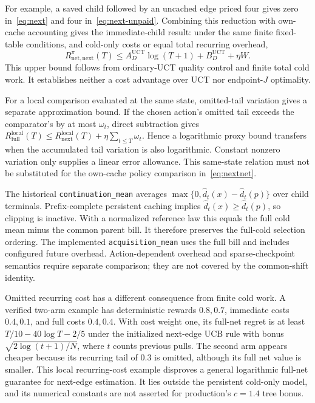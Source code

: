 For
example, a saved child followed by an uncached edge priced four gives zero
in~\eqref{eq:next} and four in~\eqref{eq:next-unpaid}.
Combining this reduction with own-cache accounting gives the immediate-child result: under the same finite fixed-table conditions, and cold-only costs or equal total recurring overhead,
\begin{equation}
 R_{\mathrm{net,next}}^\pi(T)
 \le A_D^{\mathrm{UCT}}\log(T+1)+B_D^{\mathrm{UCT}}+\eta W.
 \label{eq:nextnet}
\end{equation}
This upper bound follows from ordinary-UCT quality control and finite total cold work. It establishes neither a cost advantage over UCT nor endpoint-$J$ optimality.

For a local comparison evaluated at the same state, omitted-tail variation gives a separate approximation bound. If the chosen action's omitted tail exceeds the comparator's by at most $\omega_t$, direct subtraction gives $R_{\mathrm{full}}^{\mathrm{local}}(T)\le R_{\mathrm{next}}^{\mathrm{local}}(T)+\eta\sum_{t\le T}\omega_t$. Hence a logarithmic proxy bound transfers when the accumulated tail variation is also logarithmic. Constant nonzero variation only supplies a linear error allowance. This same-state relation must not be substituted for the own-cache policy comparison in~\eqref{eq:nextnet}.

The historical \texttt{continuation\_mean} averages
$\max\{0,\widehat d_t(x)-\widehat d_t(p)\}$ over child terminals. Prefix-complete persistent caching implies $\widehat d_t(x)\ge\widehat d_t(p)$, so clipping is inactive. With a normalized reference law this equals the full cold mean minus the common parent bill. It therefore preserves the full-cold selection ordering. The implemented \texttt{acquisition\_mean} uses the full bill and includes configured future overhead. Action-dependent overhead and sparse-checkpoint semantics require separate comparison; they are not covered by the common-shift identity.

Omitted recurring cost has a different consequence from finite cold work. A verified two-arm example has deterministic rewards $0.8,0.7$, immediate costs $0.4,0.1$, and full costs $0.4,0.4$. With cost weight one, its full-net regret is at least $T/10-40\log T-2/5$ under the initialized next-edge UCB rule with bonus $\sqrt{2\log(t+1)/N}$, where $t$ counts previous pulls. The second arm appears cheaper because its recurring tail of $0.3$ is omitted, although its full net value is smaller. This local recurring-cost example disproves a general logarithmic full-net guarantee for next-edge estimation. It lies outside the persistent cold-only model, and its numerical constants are not asserted for production's $c=1.4$ tree bonus.

